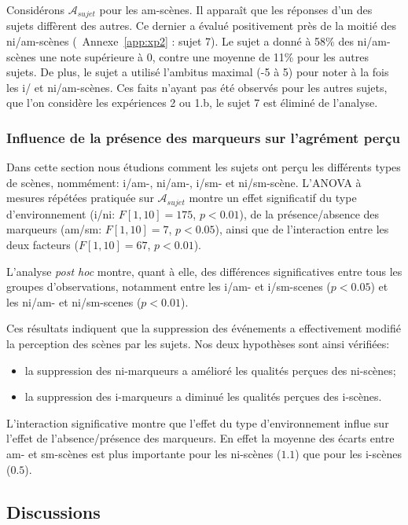 \documentclass[twoside,twocolumn]{article}
\begin{document}
Considérons $\mathcal{A}_{sujet}$ pour les am-scènes. Il apparaît que les réponses d'un des sujets diffèrent des autres. Ce dernier a évalué positivement près de la moitié des ni/am-scènes (\cf~Annexe~\ref{app:xp2} : sujet 7). Le sujet a donné à 58\% des ni/am-scènes une note supérieure à 0, contre une moyenne de 11\% pour les autres sujets. De plus, le sujet a utilisé l'ambitus maximal (-5 à 5) pour noter à la fois les i/ et ni/am-scènes. Ces faits n'ayant pas été observés pour les autres sujets, que l'on considère les expériences 2 ou 1.b, le sujet 7 est éliminé de l'analyse.

\subsubsection{Influence de la présence des marqueurs sur l'agrément perçu}


Dans cette section nous étudions comment les sujets ont perçu les différents types de scènes, nommément: i/am-, ni/am-, i/sm- et ni/sm-scène. L'ANOVA à mesures répétées pratiquée sur $\mathcal{A}_{sujet}$ montre un effet significatif du type d'environnement (i/ni: $F[1,10]=175$, $p<0.01$), de la présence/absence des marqueurs (am/sm: $F[1,10]=7$, $p<0.05$), ainsi que de l'interaction entre les deux facteurs ($F[1,10]=67$, $p<0.01$).

L'analyse \emph{post hoc} montre, quant à elle, des différences significatives entre tous les groupes d'observations, notamment entre les i/am- et i/sm-scenes ($p<0.05$) et les ni/am- et ni/sm-scenes ($p<0.01$).

Ces résultats indiquent que la suppression des événements a effectivement modifié la perception des scènes par les sujets. Nos deux hypothèses sont ainsi vérifiées:

\begin{itemize}
\item la suppression des ni-marqueurs a amélioré les qualités perçues des ni-scènes;
\item la suppression des i-marqueurs a diminué les qualités perçues des i-scènes.
\end{itemize}

L'interaction significative montre que l'effet du type d'environnement influe sur l'effet de l'absence/présence des marqueurs. En effet la moyenne des écarts entre am- et sm-scènes est plus importante pour les ni-scènes ($1.1$) que pour les i-scènes ($0.5$).

\subsection{Discussions}
\end{document}
